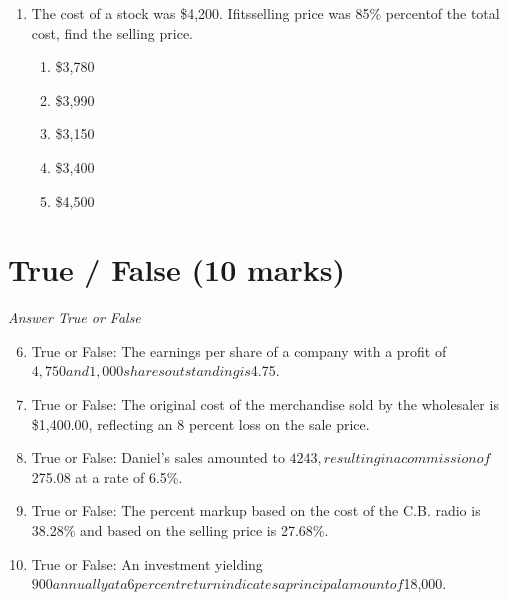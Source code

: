 \documentclass[12pt]{article}
\begin{document}
\begin{enumerate}[label=\arabic*.]
\begin{enumerate}[label=(\alph*)]
    \item (a) .15 (b) .148 (c) .1
    \item (a) .15 (b) .147 (c) .14
    \item (a) .14 (b) .148 (c) .2
    \item (a) .14 (b) .149 (c) .14
    \item (a) .15 (b) .149 (c) .15
\end{enumerate}
\item The cost of a stock was \$4,200. Ifitsselling price was 85\% percentof the total cost, find the selling price.
\begin{enumerate}[label=(\alph*)]
    \item \$3,780
    \item \$3,990
    \item \$3,150
    \item \$3,400
    \item \$4,500
\end{enumerate}
\end{enumerate}

\section*{True / False (10 marks)}
\textit{Answer True or False}
\begin{enumerate}[label=\arabic*.]
\setcounter{enumi}{5}
\item True or False: The earnings per share of a company with a profit of $4,750 and 1,000 shares outstanding is $4.75.
\item True or False: The original cost of the merchandise sold by the wholesaler is \$1,400.00, reflecting an 8 percent loss on the sale price.
\item True or False: Daniel's sales amounted to $4243, resulting in a commission of $275.08 at a rate of 6.5\%.
\item True or False: The percent markup based on the cost of the C.B. radio is 38.28\% and based on the selling price is 27.68\%.
\item True or False: An investment yielding $900 annually at a 6 percent return indicates a principal amount of $18,000.
\end{enumerate}
\end{document}
